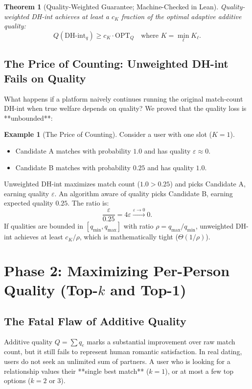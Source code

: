 \documentclass[11pt,letterpaper]{article}
\theoremstyle{definition}
\newtheorem{example}{Example}[section]
\theoremstyle{plain}
\newtheorem{theorem}{Theorem}[section]
\theoremstyle{remark}
\begin{document}
\begin{theorem}[Quality-Weighted Guarantee; Machine-Checked in Lean]
Quality-weighted DH-int achieves at least a $c_K$ fraction of the optimal adaptive additive quality:
\begin{equation}
    Q(\text{DH-int}_q) \ge c_K \cdot \mathrm{OPT}_Q \quad \text{where } K = \min_\ell K_\ell.
\end{equation}
\end{theorem}

\subsection{The Price of Counting: Unweighted DH-int Fails on Quality}
What happens if a platform naively continues running the original match-count DH-int when true welfare depends on quality? We proved that the quality loss is **unbounded**:

\begin{example}[The Price of Counting]
Consider a user with one slot ($K=1$). 
\begin{itemize}
    \item Candidate A matches with probability $1.0$ and has quality $\varepsilon \approx 0$.
    \item Candidate B matches with probability $0.25$ and has quality $1.0$.
\end{itemize}
Unweighted DH-int maximizes match count ($1.0 > 0.25$) and picks Candidate A, earning quality $\varepsilon$. An algorithm aware of quality picks Candidate B, earning expected quality $0.25$. The ratio is:
$$\frac{\varepsilon}{0.25} = 4\varepsilon \xrightarrow{\varepsilon \to 0} 0.$$
If qualities are bounded in $[q_{\min}, q_{\max}]$ with ratio $\rho = q_{\max}/q_{\min}$, unweighted DH-int achieves at least $c_K / \rho$, which is mathematically tight ($\Theta(1/\rho)$).
\end{example}

\newpage
\section{Phase 2: Maximizing Per-Person Quality (Top-$k$ and Top-1)}
\label{sec:topk}

\subsection{The Fatal Flaw of Additive Quality}
Additive quality $Q = \sum q_e$ marks a substantial improvement over raw match count, but it still fails to represent human romantic satisfaction. In real dating, users do not seek an unlimited sum of partners. A user who is looking for a relationship values their **single best match** ($k=1$), or at most a few top options ($k=2$ or $3$).
\end{document}

